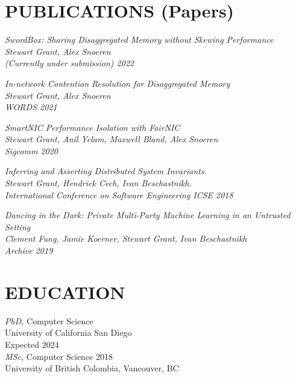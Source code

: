 \documentclass[line,margin]{res}
\begin{document}
\address{https://www.stewartgrant.ca}
\address{ssgrant@eng.ucsd.edu}
\begin{resume}

\section{PUBLICATIONS (Papers)}

{\sl 
    SwordBox: Sharing Disaggregated Memory without Skewing Performance \\
    Stewart Grant, Alex Snoeren\\
    (Currently under submission) 2022 \\
    }

{\sl 
    In-network Contention Resolution for Disaggregated Memory \\
    Stewart Grant, Alex Snoeren\\
    WORDS 2021 \\
    }

{\sl 
    SmartNIC Performance Isolation with FairNIC \\
    Stewart Grant, Anil Yelam, Maxwell Bland, Alex Snoeren\\
    Sigcomm 2020 \\
    }

{\sl 
    Inferring and Asserting Distributed System Invariants. \\
    Stewart Grant, Hendrick Cech, Ivan Beschastnikh. \\
    International Conference on Software Engineering ICSE 2018 \\
    }

{\sl 
    Dancing in the Dark: Private Multi-Party Machine Learning in an Untrusted Setting \\
    Clement Fung, Jamie Koerner, Stewart Grant, Ivan Beschastnikh \\
    Archive 2019
    }

\section{EDUCATION}
{\sl PhD,} Computer Science \\
University of California San Diego \\
Expected 2024 \\

{\sl MSc,} Computer Science \hfill 2018 \\
University of British Colombia, Vancouver, BC \\


\end{resume}
\end{document}
